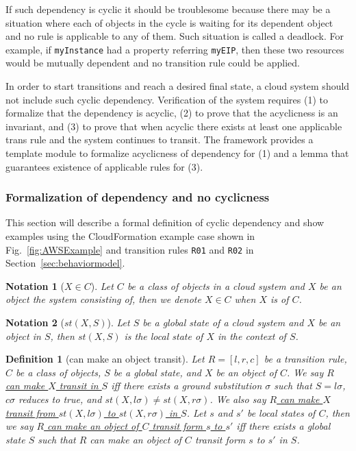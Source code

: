 \documentclass[12pt]{report}
\newtheorem{notation}{Notation}
\newtheorem{definition}{Definition}
\newcommand{\ul}{\underline}
\begin{document}
If such dependency is cyclic it should be troublesome because there
may be a situation where each of objects in the cycle is waiting for
its dependent object and no rule is applicable to any of them. Such
situation is called a deadlock.  For example, if {\tt myInstance} had
a property referring {\tt myEIP}, then these two resources would be
mutually dependent and no transition rule could be applied.

In order to start transitions and reach a desired final state, a cloud
system should not include such cyclic dependency. Verification of the
system requires (1) to formalize that the dependency is acyclic, (2)
to prove that the acyclicness is an invariant, and (3) to prove that
when acyclic there exists at least one applicable trans rule and the
system continues to transit. The framework provides a template module
to formalize acyclicness of dependency for (1) and a lemma that
guarantees existence of applicable rules for (3).

\subsubsection{Formalization of dependency and no cyclicness}
This section will describe a formal definition of cyclic dependency
and show examples using the CloudFormation example case shown in
Fig.~\ref{fig:AWSExample} and transition rules {\tt R01} and {\tt R02}
in Section~\ref{sec:behaviormodel}.

\begin{notation}[$X \in C$]
Let $C$ be a class of objects in a cloud system and $X$ be an object
the system consisting of, then we denote \ul{$X \in C$} when $X$ is of
$C$.
\end{notation}

\begin{notation}[$st(X,S)$]
Let $S$ be a global state of a cloud system and $X$ be an object in
$S$, then \ul{$st(X,S)$} is the local state of $X$ in the context of
$S$.
\end{notation}

\begin{definition}[can make an object transit]
Let $R = [l,r,c]$ be a transition rule, $C$ be a class of objects, $S$
be a global state, and $X$ be an object of $C$. We say \ul{$R$ can
  make $X$ transit in $S$} iff there exists a ground substitution
$\sigma$ such that $S = l\sigma$, $c\sigma$ reduces to true, and
$st(X,l\sigma) \ne st(X,r\sigma)$. We also say \ul{$R$ can make $X$
  transit from $st(X,l\sigma)$ to $st(X,r\sigma)$ in $S$}.  Let $s$
and $s'$ be local states of $C$, then we say \ul{$R$ can make an object
  of $C$ transit form $s$ to $s'$} iff there exists a global state $S$
such that $R$ can make an object of $C$ transit form $s$ to $s'$ in $S$.
\end{definition}
\end{document}
